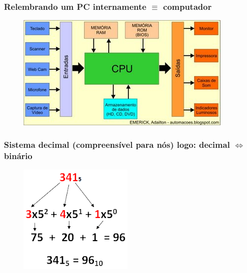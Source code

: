 \documentclass[10pt]{beamer}
\begin{document}
\begin{frame}[fragile]

\frametitle{Relembrando um PC internamente $\equiv $ computador}

\begin{figure}[!ht]
\centering
\includegraphics[height =.5\textheight,width=.7\textwidth]
{figuras/estrutura-PC.jpg}
\end{figure}

\end{frame}


\begin{frame}[fragile]

\frametitle{Sistema decimal (compreensível para nós) logo: decimal $\Leftrightarrow$ binário}

\begin{figure}[!ht]
\centering
\includegraphics[height =.5\textheight,width=.6\textwidth]
{figuras/sistema_decimal.png}
\end{figure}

\end{frame}
\end{document}
